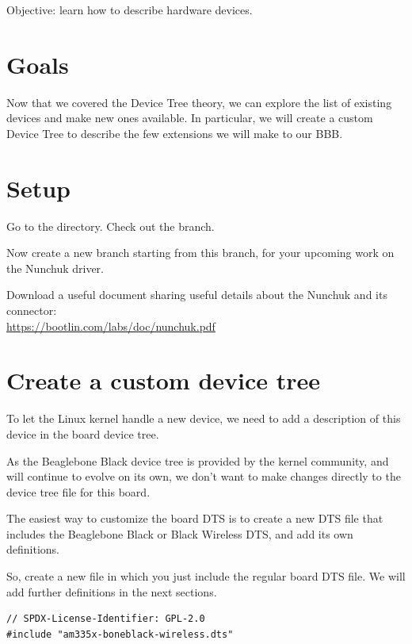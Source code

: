 {Objective: learn how to describe hardware devices.}

\section{Goals}

Now that we covered the Device Tree theory, we can explore the list of
existing devices and make new ones available. In particular, we will
create a custom Device Tree to describe the few extensions we will make
to our BBB.

\section{Setup}

Go to the  directory. Check out the
 branch.

Now create a new  branch starting from this branch,
for your upcoming work on the Nunchuk driver.

Download a useful document sharing useful details about the Nunchuk
and its connector:\\
\url{https://bootlin.com/labs/doc/nunchuk.pdf}

\section{Create a custom device tree}

To let the Linux kernel handle a new device, we need to add a
description of this device in the board device tree.

As the Beaglebone Black device tree is provided by the kernel community,
and will continue to evolve on its own, we don't want to make changes
directly to the device tree file for this board.

The easiest way to customize the board DTS is to create a new DTS file
that includes the Beaglebone Black or Black Wireless DTS, and add
its own definitions.

So, create a new  file in which you
just include the regular board DTS file. We will add further definitions
in the next sections.

\begin{verbatim}
// SPDX-License-Identifier: GPL-2.0
#include "am335x-boneblack-wireless.dts"
\end{verbatim}

